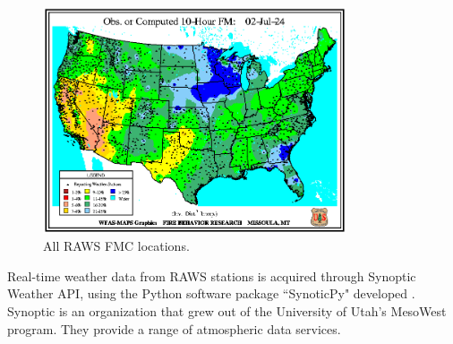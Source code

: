 \documentclass[11pt]{article}%
\begin{document}
\begin{figure}[ht]
    \centering
    \includegraphics[width=0.8\textwidth]{images/WFAS-RAWS-map.png}
    \caption{All RAWS FMC locations.}
    \label{fig:wfas_raws}
\end{figure}

Real-time weather data from RAWS stations is acquired through Synoptic Weather API, using the Python software package ``SynoticPy" developed \citep{Synoptic-2024-SWA, Blaylock-2023-SPA}. Synoptic is an organization that grew out of the University of Utah's MesoWest program. They provide a range of atmospheric data services.
\end{document}

